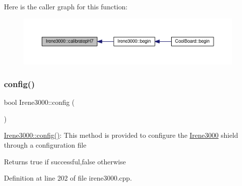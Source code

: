 Here is the caller graph for this function\+:\nopagebreak
\begin{figure}[H]
\begin{center}
\leavevmode
\includegraphics[width=350pt]{d6/d03/class_irene3000_a1d3299202e4cb7afcff9c9e3e95d94c1_icgraph}
\end{center}
\end{figure}
\mbox{\label{class_irene3000_afed5c35e4b23963c157847ef27c11e9c}} 
\subsubsection{\texorpdfstring{config()}{config()}}
{\footnotesize\ttfamily bool Irene3000\+::config (\begin{DoxyParamCaption}{ }\end{DoxyParamCaption})}

\hyperlink{class_irene3000_afed5c35e4b23963c157847ef27c11e9c}{Irene3000\+::config()}\+: This method is provided to configure the \hyperlink{class_irene3000}{Irene3000} shield through a configuration file

\begin{DoxyReturn}{Returns}
true if successful,false otherwise 
\end{DoxyReturn}


Definition at line 202 of file irene3000.\+cpp.


